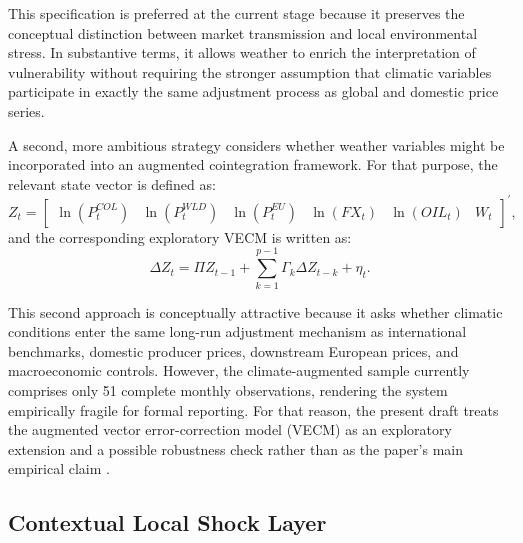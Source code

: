 \documentclass[11pt]{article}
\begin{document}
This specification is preferred at the current stage because it preserves the conceptual distinction between market transmission and local environmental stress. In substantive terms, it allows weather to enrich the interpretation of vulnerability without requiring the stronger assumption that climatic variables participate in exactly the same adjustment process as global and domestic price series.

A second, more ambitious strategy considers whether weather variables might be incorporated into an augmented cointegration framework. For that purpose, the relevant state vector is defined as:
\begin{equation}
Z_t =
\begin{bmatrix}
\ln(P^{COL}_{t}) &
\ln(P^{WLD}_{t}) &
\ln(P^{EU}_{t}) &
\ln(FX_t) &
\ln(OIL_t) &
W_t
\end{bmatrix}^{\prime},
\label{eq:augmented_state}
\end{equation}
and the corresponding exploratory VECM is written as:
\begin{equation}
\Delta Z_t = \Pi Z_{t-1} + \sum_{k=1}^{p-1} \Gamma_k \Delta Z_{t-k} + \eta_t.
\label{eq:vecm}
\end{equation}

This second approach is conceptually attractive because it asks whether climatic conditions enter the same long-run adjustment mechanism as international benchmarks, domestic producer prices, downstream European prices, and macroeconomic controls. However, the climate-augmented sample currently comprises only 51 complete monthly observations, rendering the system empirically fragile for formal reporting. For that reason, the present draft treats the augmented vector error-correction model (VECM) as an exploratory extension and a possible robustness check rather than as the paper's main empirical claim \citep{johansen_1991,hakkio_rush_1991}.

\subsection{Contextual Local Shock Layer}
\end{document}
